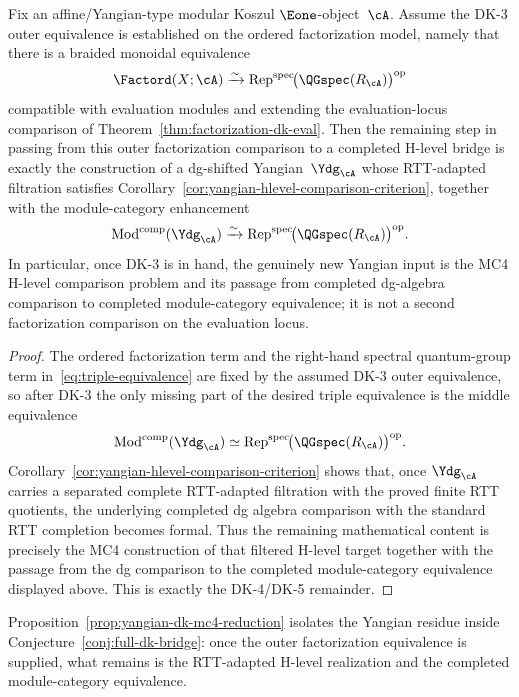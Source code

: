 \begin{proposition}
\label{prop:yangian-dk-mc4-reduction}
Fix an affine/Yangian-type modular Koszul $\Eone$-object~$\cA$.
Assume the DK-3 outer equivalence is established on the ordered
factorization model, namely that there is a braided monoidal
equivalence
\[
\Factord(X;\cA)
\xrightarrow{\sim}
\operatorname{Rep}^{\mathrm{spec}}\!
 \bigl(\QGspec(R_{\cA})\bigr)^{\mathrm{op}}
\]
compatible with evaluation modules and extending the
evaluation-locus comparison of
Theorem~\ref{thm:factorization-dk-eval}. Then the remaining step in
passing from this outer factorization comparison to a completed
H-level bridge is exactly the construction of a dg-shifted
Yangian~$\Ydg_{\cA}$ whose RTT-adapted filtration satisfies
Corollary~\ref{cor:yangian-hlevel-comparison-criterion}, together with
the module-category enhancement
\[
\operatorname{Mod}^{\mathrm{comp}}(\Ydg_{\cA})
\xrightarrow{\sim}
\operatorname{Rep}^{\mathrm{spec}}\!
 \bigl(\QGspec(R_{\cA})\bigr)^{\mathrm{op}}.
\]
In particular, once DK-3 is in hand, the genuinely new Yangian input is
the MC4 H-level comparison problem and its passage from completed
dg-algebra comparison to completed module-category equivalence; it is
not a second factorization comparison on the evaluation locus.
\end{proposition}

\begin{proof}
The ordered factorization term and the right-hand spectral quantum-group
term in~\eqref{eq:triple-equivalence} are fixed by the assumed DK-3
outer equivalence, so after DK-3 the only missing part of the desired
triple equivalence is the middle equivalence
\[
\operatorname{Mod}^{\mathrm{comp}}(\Ydg_{\cA})
\simeq
\operatorname{Rep}^{\mathrm{spec}}\!
 \bigl(\QGspec(R_{\cA})\bigr)^{\mathrm{op}}.
\]
Corollary~\ref{cor:yangian-hlevel-comparison-criterion} shows that, once
$\Ydg_{\cA}$ carries a separated complete RTT-adapted filtration with
the proved finite RTT quotients, the underlying completed dg
algebra comparison with the standard RTT completion becomes formal.
Thus the remaining mathematical content is precisely the MC4
construction of that filtered H-level target together with the passage
from the dg comparison to the completed module-category equivalence
displayed above. This is exactly the DK-4/DK-5 remainder.
\end{proof}

\begin{remark}
\label{rem:yangian-dk-mc4-reduction-application}
Proposition~\ref{prop:yangian-dk-mc4-reduction} isolates the Yangian
residue inside Conjecture~\ref{conj:full-dk-bridge}: once the outer
factorization equivalence is supplied, what remains is the
RTT-adapted H-level realization and the completed
module-category equivalence.
\end{remark}

